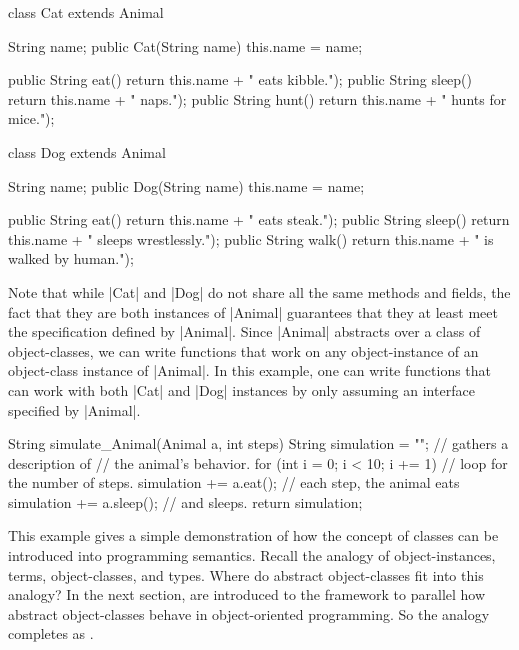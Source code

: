 \newpage
\begin{snippet-Java}
class Cat extends Animal {

  String name;
  public Cat(String name) { this.name = name; }

  public String eat()   { return this.name + " eats kibble."); }
  public String sleep() { return this.name + " naps."); }
  public String hunt()  { return this.name + " hunts for mice."); }

}
\end{snippet-Java}
\begin{snippet-Java}
class Dog extends Animal {

  String name;
  public Dog(String name) { this.name = name; }

  public String eat()   { return this.name + " eats steak."); }
  public String sleep() { return this.name + " sleeps wrestlessly."); }
  public String walk()  { return this.name + " is walked by human."); }

}
\end{snippet-Java}

Note that while \code|Cat| and \code|Dog| do not share all the same methods and fields, the fact that they are both instances of \code|Animal| guarantees that they at least meet the specification defined by \code|Animal|.
Since \code|Animal| abstracts over a class of object-classes, we can write functions that work on any object-instance of an object-class instance of \code|Animal|.
In this example, one can write functions that can work with both \code|Cat| and \code|Dog| instances by only assuming an interface specified by \code|Animal|.
\begin{snippet-Java}
String simulate_Animal(Animal a, int steps) {
  String simulation = "";           // gathers a description of
                                    // the animal's behavior.
  for (int i = 0; i < 10; i += 1) { // loop for the number of steps.
    simulation += a.eat();          // each step, the animal eats
    simulation += a.sleep();        // and sleeps.
  }
  return simulation;
}
\end{snippet-Java}


This example gives a simple demonstration of how the concept of classes can be introduced into programming semantics.
Recall the analogy of object-instances, terms, object-classes, and types.
Where do abstract object-classes fit into this analogy?
In the next section,  are introduced to the \LangA framework to parallel how abstract object-classes behave in object-oriented programming.
So the analogy completes as .

